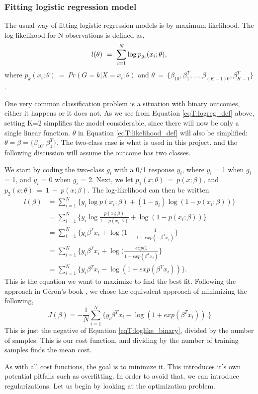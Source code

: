 \subsubsection{Fitting logistic regression model}
The usual way of fitting logistic regression models is by maximum likelihood. The log-likelihood for N observations is defined as,
\begin{equation}\label{eqT:likelihood_def}
l(\theta)\ =\ \sum_{i=1}^{N}\log p_{g_i}(x_i;\theta),\\
\end{equation}
where $p_k(x_i;\theta)\ =\ Pr(G=k|X=x_i;\theta)$ and $\theta\ =\ \{\beta_{10}, \beta_1^T,\dots, \beta_{(K-1)0}, \beta_{K-1}^T\}$.

One very common classification problem is a situation with binary outcomes, either it happens or it does not. As we see from Equation \ref{eqT:logreg_def} above, setting K=2 simplifies the model considerable, since there will now be only a single linear function. $\theta$ in Equation \ref{eqT:likelihood_def} will also be simplified: $\theta = \beta = \{\beta_{10}, \beta_1^T\}$. The two-class case is what is used in this project, and the following discussion will assume the outcome has two classes.

We start by coding the two-class $g_i$ with a 0/1 response $y_i$, where $y_i$ = 1 when $g_i$ = 1, and $y_i$ = 0 when $g_i$ = 2. Next, we let $p_1(x;\theta)\ =\ p(x;\beta)$, and $p_2(x;\theta)\ =\ 1\ -\ p(x;\beta)$. The log-likelihood can then be written
\begin{equation}\label{eqT:loglike_binary}
\begin{split}
l(\beta) &= \sum_{i=1}^N\{y_i\log p(x_i;\beta)+(1-y_i)\log(1-p(x_i;\beta))\}\\
 &= \sum_{i=1}^N\{y_i\log\frac{p(x_i;\beta)}{1-p(x_i;\beta)}+\log(1-p(x_i;\beta))\}\\
 &= \sum_{i=1}^N\{y_i\beta^Tx_i + \log(1-\frac{1}{1+exp(-\beta^Tx_i)}\}\\
 &= \sum_{i=1}^N\{y_i\beta^Tx_i + \log(\frac{exp(1}{1+exp(\beta^Tx_i)}\}\\
 &= \sum_{i=1}^N\{y_i\beta^Tx_i - \log(1+exp(\beta^Tx_i))\}.
\end{split}
\end{equation}
This is the equation we want to maximize to find the best fit. Following the approach in Géron's book \citep{Geron}, we chose the equivalent approach of minimizing the following,
\begin{equation}\label{eq:Geron_cost}
J(\beta) = -\frac{1}{N}\sum_{i=1}^N\{y_i\beta^Tx_i - \log(1+exp(\beta^Tx_i)).\}
\end{equation}
This is just the negative of Equation \ref{eqT:loglike_binary}, divided by the number of samples. This is our cost function, and dividing by the number of training samples finds the mean cost.

As with all cost functions, the goal is to minimize it. This introduces it's own potential pitfalls such as overfitting. In order to avoid that, we can introduce regularizations. Let us begin by looking at the optimization problem.

